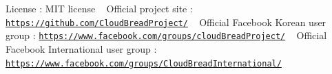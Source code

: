 License \+: M\+IT license ~\newline
Official project site \+: \href{https://github.com/CloudBreadProject/}{\tt https\+://github.\+com/\+Cloud\+Bread\+Project/} ~\newline
Official Facebook Korean user group \+: \href{https://www.facebook.com/groups/cloudBreadProject/}{\tt https\+://www.\+facebook.\+com/groups/cloud\+Bread\+Project/} ~\newline
Official Facebook International user group \+: \href{https://www.facebook.com/groups/CloudBreadInternational/}{\tt https\+://www.\+facebook.\+com/groups/\+Cloud\+Bread\+International/} ~\newline
